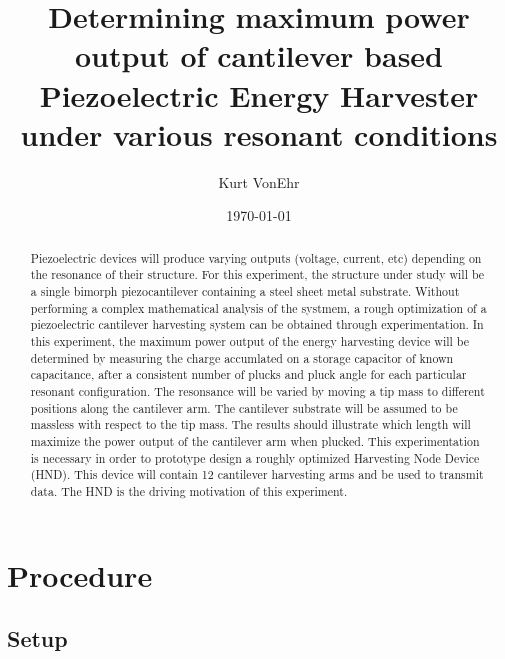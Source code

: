 \documentclass[aps,prl,twocolumn,groupedaddress]{revtex4}
\begin{document}
\title{Determining maximum power output of cantilever based Piezoelectric Energy Harvester under various resonant conditions}


\author{Kurt VonEhr}

\date{\today}

\begin{abstract}

Piezoelectric devices will produce varying outputs (voltage, current, etc) depending on the resonance of their structure. For this experiment, the structure under study will be a single bimorph piezocantilever containing a steel sheet metal substrate. Without performing a complex mathematical analysis of the systmem, a rough optimization of a piezoelectric cantilever harvesting system can be obtained through experimentation. In this experiment, the maximum power output of the energy harvesting device will be determined by measuring the charge accumlated on a storage capacitor of known capacitance, after a consistent number of plucks and pluck angle for each particular resonant configuration. The resonsance will be varied by moving a tip mass to different positions along the cantilever arm. The cantilever substrate will be assumed to be massless with respect to the tip mass. The results should illustrate which length will maximize the power output of the cantilever arm when plucked. This experimentation is necessary in order to prototype design a roughly optimized Harvesting Node Device (HND). This device will contain 12 cantilever harvesting arms and be used to transmit data. The HND is the driving motivation of this experiment. 
\end{abstract}
 
\maketitle

\section{Procedure}
\subsection{Setup}
\end{document}
